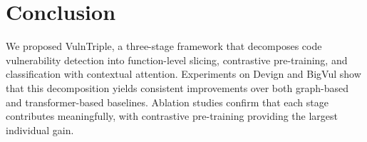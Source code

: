 \documentclass[conference]{IEEEtran}
\begin{document}
\section{Conclusion}\label{sec:conclusion}

We proposed VulnTriple, a three-stage framework that decomposes code vulnerability detection
into function-level slicing, contrastive pre-training, and classification with contextual attention.
Experiments on Devign and BigVul show that this decomposition yields consistent improvements over
both graph-based and transformer-based baselines.
Ablation studies confirm that each stage contributes meaningfully,
with contrastive pre-training providing the largest individual gain.



\end{document}
